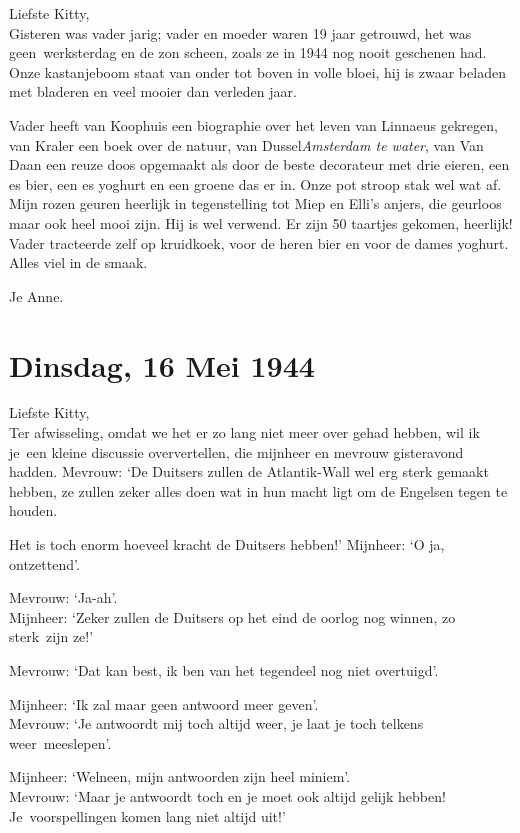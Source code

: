 \documentclass{book}
\begin{document}
Liefste Kitty,\\Gisteren was vader jarig; vader en moeder waren 19 jaar
getrouwd, het was geen~werksterdag en de zon scheen, zoals ze in 1944
nog nooit geschenen had. Onze kastanjeboom staat van onder tot boven in
volle bloei, hij is zwaar beladen met bladeren en veel mooier dan
verleden jaar.

Vader heeft van Koophuis een biographie over het leven van Linnaeus
gekregen, van Kraler een boek over de natuur, van Dussel\emph{Amsterdam
te water}, van Van Daan een reuze doos opgemaakt als door de beste
decorateur met drie eieren, een es bier, een es yoghurt en een groene
das er in. Onze pot stroop stak wel wat af. Mijn rozen geuren heerlijk
in tegenstelling tot Miep en Elli's anjers, die geurloos maar ook heel
mooi zijn. Hij is wel verwend. Er zijn 50 taartjes gekomen, heerlijk!
Vader tracteerde zelf op kruidkoek, voor de heren bier en voor de dames
yoghurt. Alles viel in de smaak.

Je Anne.

\chapter{Dinsdag, 16 Mei 1944}

Liefste Kitty,\\Ter afwisseling, omdat we het er zo lang niet meer over
gehad hebben, wil ik je~een kleine discussie oververtellen, die mijnheer
en mevrouw gisteravond hadden. Mevrouw: `De Duitsers zullen de
Atlantik-Wall wel erg sterk gemaakt hebben, ze zullen zeker alles doen
wat in hun macht ligt om de Engelsen tegen te houden.

Het is toch enorm hoeveel kracht de Duitsers hebben!' Mijnheer: `O ja,
ontzettend'.

Mevrouw: `Ja-ah'.\\Mijnheer: `Zeker zullen de Duitsers op het eind de
oorlog nog winnen, zo sterk~zijn ze!'

Mevrouw: `Dat kan best, ik ben van het tegendeel nog niet overtuigd'.~

Mijnheer: `Ik zal maar geen antwoord meer geven'.\\Mevrouw: `Je
antwoordt mij toch altijd weer, je laat je toch telkens weer~meeslepen'.

Mijnheer: `Welneen, mijn antwoorden zijn heel miniem'.\\Mevrouw: `Maar
je antwoordt toch en je moet ook altijd gelijk hebben! Je~voorspellingen
komen lang niet altijd uit!'
\end{document}
